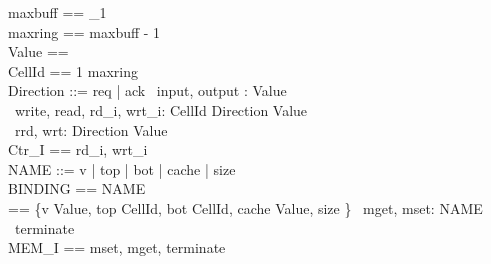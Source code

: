 \documentclass{llncs}
\newcommand{\universe}{\mathbb{U}}
\begin{document}
\begin{circus}
    maxbuff == \nat_1 \\
    maxring == maxbuff - 1 \\
    Value == \nat \\
    CellId == 1 \range maxring \\
    Direction ::=  req | ack
    \also
    \circchannel\ input, output : Value \\
    \circchannel\ write, read, rd\_i, wrt\_i: CellId \cross Direction \cross Value \\
    \circchannel\ rrd, wrt: Direction \cross Value \\
    \circchannelset Ctr\_I == \lchanset rd\_i, wrt\_i \rchanset \\
    \also
    NAME ::=   v | top | bot | cache | size \\
    \also BINDING == NAME \fun \universe \\
    \delta == \{v \mapsto Value, top \mapsto CellId, bot \mapsto CellId, cache \mapsto Value, size \mapsto \nat \}
    \also
    \circchannel\ mget, mset: NAME \cross \universe \\
    \circchannel\ terminate \\
    \circchannelset MEM\_I == \lchanset mset, mget, terminate \rchanset \\
\end{circus}%
\end{document}
